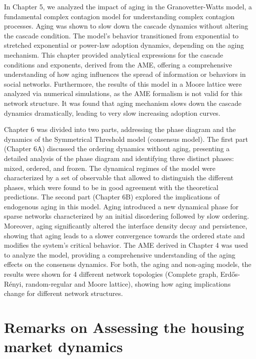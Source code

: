 In Chapter 5, we analyzed the impact of aging in the Granovetter-Watts model, a fundamental complex contagion model for understanding complex contagion processes. Aging was shown to slow down the cascade dynamics without altering the cascade condition. The model's behavior transitioned from exponential to stretched exponential or power-law adoption dynamics, depending on the aging mechanism. This chapter provided analytical expressions for the cascade conditions and exponents, derived from the AME, offering a comprehensive understanding of how aging influences the spread of information or behaviors in social networks. Furthermore, the results of this model in a Moore lattice were analyzed via numerical simulations, as the AME formalism is not valid for this network structure. It was found that aging mechanism slows down the cascade dynamics dramatically, leading to very slow increasing adoption curves.

Chapter 6 was divided into two parts, addressing the phase diagram and the dynamics of the Symmetrical Threshold model (consensus model). The first part (Chapter 6A) discussed the ordering dynamics without aging, presenting a detailed analysis of the phase diagram and identifying three distinct phases: mixed, ordered, and frozen. The dynamical regimes of the model were characterized by a set of observable that allowed to distinguish the different phases, which were found to be in good agreement with the theoretical predictions. The second part (Chapter 6B) explored the implications of endogenous aging in this model. Aging introduced a new dynamical phase for sparse networks characterized by an initial disordering followed by slow ordering. Moreover, aging significantly altered the interface density decay and persistence, showing that aging leads to a slower convergence towards the ordered state and modifies the system's critical behavior. The AME derived in Chapter 4 was used to analyze the model, providing a comprehensive understanding of the aging effects on the consensus dynamics. For both, the aging and non-aging models, the results were shown for 4 different network topologies (Complete graph, Erd\H{o}s-Rényi, random-regular and Moore lattice), showing how aging implications change for different network structures.

\section{Remarks on Assessing the housing market dynamics \label{sec:housing_market_dynamics}}

